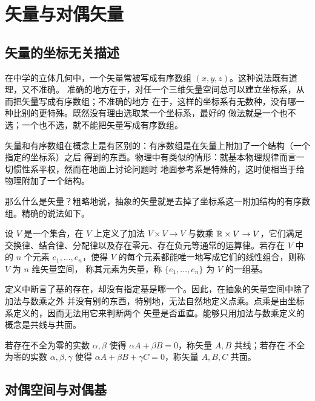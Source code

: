 \chapter{矢量与对偶矢量}

\section{矢量的坐标无关描述}

在中学的立体几何中，一个矢量常被写成有序数组 $(x,y,z)$。这种说法既有道理，又不准确。
准确的地方在于，对任一个三维矢量空间总可以建立坐标系，从而把矢量写成有序数组；不准确的地方
在于，这样的坐标系有无数种，没有哪一种比别的更特殊。既然没有理由选取某一个坐标系，最好的
做法就是一个也不选；一个也不选，就不能把矢量写成有序数组。

矢量和有序数组在概念上是有区别的：有序数组是在矢量上附加了一个结构（一个指定的坐标系）之后
得到的东西。物理中有类似的情形：就基本物理规律而言一切惯性系平权，然而在地面上讨论问题时
地面参考系是特殊的，这时便相当于给物理附加了一个结构。

那么什么是矢量？粗略地说，抽象的矢量就是去掉了坐标系这一附加结构的有序数组。精确的说法如下。

\begin{definition}[矢量空间]
设 $V$ 是一个集合，在 $V$ 上定义了加法 $V\times V\to V$ 与数乘 $\mathbb{R}\times V\to V$，它们满足
交换律、结合律、分配律以及存在零元、存在负元等通常的运算律。若存在 $V$ 中的 $n$ 个元素
$e_1,\dots,e_n$，使得 $V$ 的每个元素都能唯一地写成它们的线性组合，则称 $V$ 为 $n$ 维矢量空间，
称其元素为矢量，称 $\{e_1,\dots,e_n\}$ 为 $V$ 的一组基。
\end{definition}

定义中断言了基的存在，却没有指定基是哪一个。因此，在抽象的矢量空间中除了加法与数乘之外
并没有别的东西，特别地，无法自然地定义点乘。点乘是由坐标系定义的，因而无法用它来判断两个
矢量是否垂直。能够只用加法与数乘定义的概念是共线与共面。

\begin{definition}[共线与共面]
若存在不全为零的实数 $\alpha,\beta$ 使得 $\alpha A+\beta B=0$，称矢量 $A,B$ 共线；若存在
不全为零的实数 $\alpha,\beta,\gamma$ 使得 $\alpha A+\beta B+\gamma C=0$，称矢量 $A,B,C$ 共面。
\end{definition}

\section{对偶空间与对偶基}

